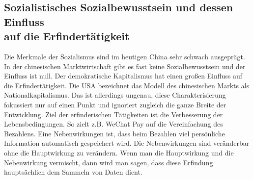 \documentclass[11pt,a4paper]{article}
\begin{document}
\subsection[Sozialistisches Sozialbewusstsein und dessen Einfluss auf die
  Erfindertätigkeit]{Sozialistisches Sozialbewusstsein und dessen Einfluss\\ auf
  die Erfindertätigkeit}

Die Merkmale der Sozialismus sind im heutigen China sehr schwach ausgeprägt.
In der chinesischen Marktwirtschaft gibt es fast keine Sozialbewusstsein und
der Einfluss ist null. Der demokratische Kapitalismus hat einen großen
Einfluss auf die Erfindertätigkeit. Die USA bezeichnet das Modell des
chinesischen Markts als Nationalkapitalismus. Das ist allerdings ungenau,
diese Charakterisierung fokussiert nur auf einen Punkt und ignoriert zugleich
die ganze Breite der Entwicklung. Ziel der erfinderischen Tätigkeiten ist die
Verbesserung der Lebensbedingungen. So zielt z.B. WeChat Pay auf die
Vereinfachung des Bezahlens. Eine Nebenwirkungen ist, dass beim Bezahlen viel
persönliche Information automatisch gespeichert wird. Die Nebenwirkungen sind
veränderbar ohne die Hauptwirkung zu verändern. Wenn man die Hauptwirkung und
die Nebenwirkung vermischt, dann wird man sagen, dass diese Erfindung
hauptsächlich dem Sammeln von Daten dient.
\end{document}

